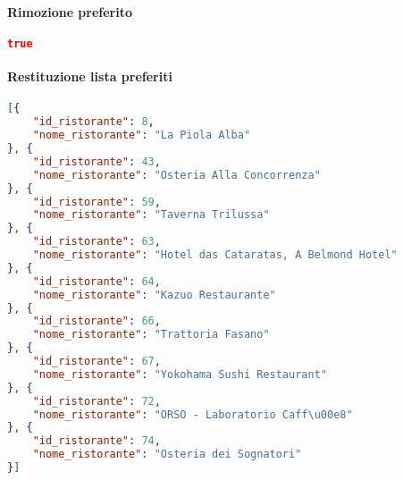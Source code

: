 \paragraph{Rimozione preferito}
\begin{lstlisting}[language=json, caption={Esempio di risposta \texttt{/favorites} per la rimozione di un preferito}, captionpos=b]
true
\end{lstlisting}


\paragraph{Restituzione lista preferiti}
\begin{lstlisting}[language=json, caption={Esempio di risposta \texttt{/favorites} per la restituzione della lista dei preferiti}, captionpos=b]
[{
    "id_ristorante": 8,
    "nome_ristorante": "La Piola Alba"
}, {
    "id_ristorante": 43,
    "nome_ristorante": "Osteria Alla Concorrenza"
}, {
    "id_ristorante": 59,
    "nome_ristorante": "Taverna Trilussa"
}, {
    "id_ristorante": 63,
    "nome_ristorante": "Hotel das Cataratas, A Belmond Hotel"
}, {
    "id_ristorante": 64,
    "nome_ristorante": "Kazuo Restaurante"
}, {
    "id_ristorante": 66,
    "nome_ristorante": "Trattoria Fasano"
}, {
    "id_ristorante": 67,
    "nome_ristorante": "Yokohama Sushi Restaurant"
}, {
    "id_ristorante": 72,
    "nome_ristorante": "ORSO - Laboratorio Caff\u00e8"
}, {
    "id_ristorante": 74,
    "nome_ristorante": "Osteria dei Sognatori"
}]
\end{lstlisting}
